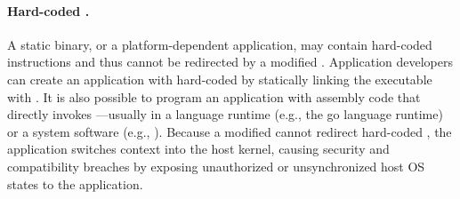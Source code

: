 \paragraph{Hard-coded \linuxapis{}.}
A static binary, or a platform-dependent application, may contain hard-coded  instructions
and thus cannot be redirected by a modified \libc{}.
Application developers can create an application with hard-coded \linuxapis{}
by statically linking the executable with \libc{}.
It is also possible to program an application
with assembly code that directly invokes \linuxapis{}---usually in a language runtime (e.g., the go language runtime) or a system software (e.g., ).
Because a modified \libc{} cannot redirect hard-coded \linuxapis{},
the application switches context into the host kernel,
causing security and compatibility breaches by exposing unauthorized or unsynchronized host OS states to the application.



